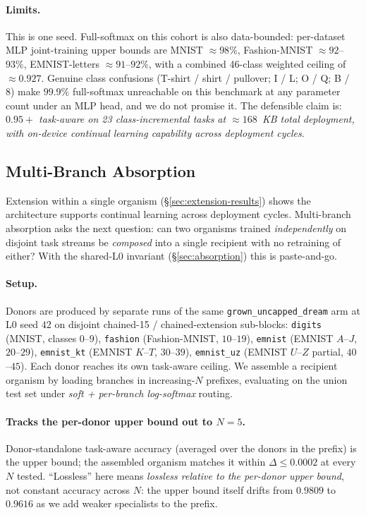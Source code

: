 \documentclass[11pt]{article}
\newcommand{\arm}[1]{\texttt{#1}}
\begin{document}
\paragraph{Limits.}
This is one seed. Full-softmax on this cohort is also data-bounded:
per-dataset MLP joint-training upper bounds are MNIST $\approx 98\%$,
Fashion-MNIST $\approx 92$--$93\%$, EMNIST-letters $\approx
91$--$92\%$, with a combined 46-class weighted ceiling of
$\approx 0.927$. Genuine class confusions (T-shirt / shirt /
pullover; I / L; O / Q; B / 8) make $99.9\%$ full-softmax unreachable
on this benchmark at any parameter count under an MLP head, and we do
not promise it. The defensible claim is: \emph{$0.95+$ task-aware on
23 class-incremental tasks at $\approx 168$~KB total deployment,
with on-device continual learning capability across deployment
cycles}.

\subsection{Multi-Branch Absorption}
\label{sec:absorption-results}

Extension within a single organism (\S\ref{sec:extension-results})
shows the architecture supports continual learning across deployment
cycles. Multi-branch absorption asks the next question: can two
organisms trained \emph{independently} on disjoint task streams be
\emph{composed} into a single recipient with no retraining of either?
With the shared-L0 invariant (\S\ref{sec:absorption}) this is
paste-and-go.

\paragraph{Setup.}
Donors are produced by separate runs of the same
\arm{grown\_uncapped\_dream} arm at L0 seed $42$ on disjoint
chained-15 / chained-extension sub-blocks: \arm{digits} (MNIST,
classes $0$--$9$), \arm{fashion} (Fashion-MNIST, $10$--$19$),
\arm{emnist} (EMNIST $A$--$J$, $20$--$29$), \arm{emnist\_kt} (EMNIST
$K$--$T$, $30$--$39$), \arm{emnist\_uz} (EMNIST $U$--$Z$ partial,
$40$--$45$). Each donor reaches its own task-aware ceiling. We
assemble a recipient organism by loading branches in increasing-$N$
prefixes, evaluating on the union test set under \emph{soft +
per-branch log-softmax} routing.

\paragraph{Tracks the per-donor upper bound out to $N = 5$.}
Donor-standalone task-aware accuracy (averaged over the donors in the
prefix) is the upper bound; the assembled organism matches it within
$\Delta \leq 0.0002$ at every $N$ tested. ``Lossless'' here means
\emph{lossless relative to the per-donor upper bound}, not constant
accuracy across $N$: the upper bound itself drifts from $0.9809$ to
$0.9616$ as we add weaker specialists to the prefix.
\end{document}
